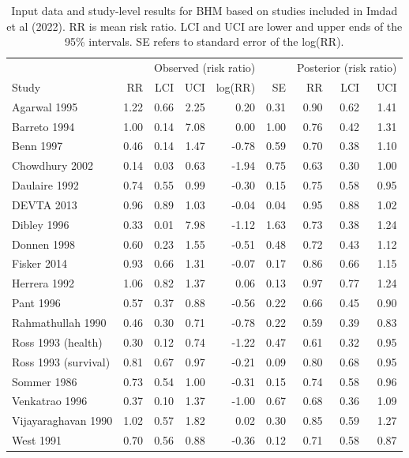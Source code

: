 \documentclass[12pt]{article}
\begin{document}
\begin{table}
\label{summary table}
\caption{Input data and study-level results for BHM based on studies included in Imdad et al (2022). RR is mean risk ratio. LCI and UCI are lower and upper ends of the 95\% intervals. SE refers to standard error of the log(RR).}
\begin{tabular}[t]{lrrrrrrrr}
\toprule
\multicolumn{1}{c}{} & \multicolumn{5}{c}{Observed (risk ratio)} & \multicolumn{3}{c}{Posterior (risk ratio)} \\
\cmidrule(l{3pt}r{3pt}){2-6} \cmidrule(l{3pt}r{3pt}){7-9}
Study & RR & LCI & UCI & log(RR) & SE & RR & LCI & UCI\\
\midrule
Agarwal 1995 & 1.22 & 0.66 & 2.25 & 0.20 & 0.31 & 0.90 & 0.62 & 1.41\\
Barreto 1994 & 1.00 & 0.14 & 7.08 & 0.00 & 1.00 & 0.76 & 0.42 & 1.31\\
Benn 1997 & 0.46 & 0.14 & 1.47 & -0.78 & 0.59 & 0.70 & 0.38 & 1.10\\
Chowdhury 2002 & 0.14 & 0.03 & 0.63 & -1.94 & 0.75 & 0.63 & 0.30 & 1.00\\
Daulaire 1992 & 0.74 & 0.55 & 0.99 & -0.30 & 0.15 & 0.75 & 0.58 & 0.95\\
\addlinespace
DEVTA 2013 & 0.96 & 0.89 & 1.03 & -0.04 & 0.04 & 0.95 & 0.88 & 1.02\\
Dibley 1996 & 0.33 & 0.01 & 7.98 & -1.12 & 1.63 & 0.73 & 0.38 & 1.24\\
Donnen 1998 & 0.60 & 0.23 & 1.55 & -0.51 & 0.48 & 0.72 & 0.43 & 1.12\\
Fisker 2014 & 0.93 & 0.66 & 1.31 & -0.07 & 0.17 & 0.86 & 0.66 & 1.15\\
Herrera 1992 & 1.06 & 0.82 & 1.37 & 0.06 & 0.13 & 0.97 & 0.77 & 1.24\\
\addlinespace
Pant 1996 & 0.57 & 0.37 & 0.88 & -0.56 & 0.22 & 0.66 & 0.45 & 0.90\\
Rahmathullah 1990 & 0.46 & 0.30 & 0.71 & -0.78 & 0.22 & 0.59 & 0.39 & 0.83\\
Ross 1993 (health) & 0.30 & 0.12 & 0.74 & -1.22 & 0.47 & 0.61 & 0.32 & 0.95\\
Ross 1993 (survival) & 0.81 & 0.67 & 0.97 & -0.21 & 0.09 & 0.80 & 0.68 & 0.95\\
Sommer 1986 & 0.73 & 0.54 & 1.00 & -0.31 & 0.15 & 0.74 & 0.58 & 0.96\\
\addlinespace
Venkatrao 1996 & 0.37 & 0.10 & 1.37 & -1.00 & 0.67 & 0.68 & 0.36 & 1.09\\
Vijayaraghavan 1990 & 1.02 & 0.57 & 1.82 & 0.02 & 0.30 & 0.85 & 0.59 & 1.27\\
West 1991 & 0.70 & 0.56 & 0.88 & -0.36 & 0.12 & 0.71 & 0.58 & 0.87\\
\bottomrule
\end{tabular}
\end{table}
\end{document}
